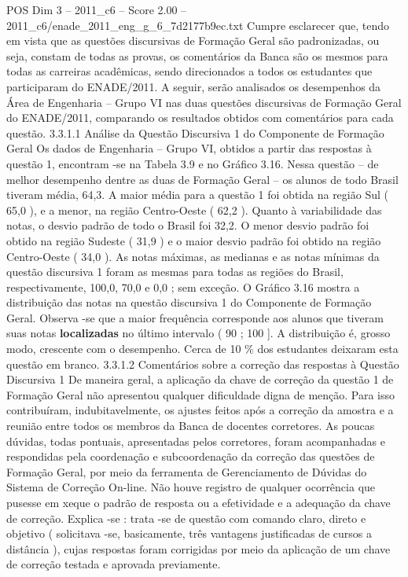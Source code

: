 \begin{textsample}{POS Dim 3 – 2011\_c6 – Score 2.00 – 2011\_c6/enade\_2011\_eng\_g\_6\_7d2177b9ec.txt}
Cumpre esclarecer que, tendo em vista que as questões discursivas de Formação Geral são padronizadas, ou seja, constam de todas as provas, os comentários da Banca são os mesmos para todas as carreiras acadêmicas, sendo direcionados a todos os estudantes que participaram do ENADE/2011.
A seguir, serão analisados os desempenhos da Área de Engenharia – Grupo VI nas duas questões discursivas de Formação Geral do ENADE/2011, comparando os resultados obtidos com comentários para cada questão. 3.3.1.1 Análise da Questão Discursiva 1 do Componente de Formação Geral Os dados de Engenharia – Grupo VI, obtidos a partir das respostas à questão 1, encontram -se na Tabela 3.9 e no Gráfico 3.16.
Nessa questão – de melhor desempenho dentre as duas de Formação Geral – os alunos de todo Brasil tiveram média, 64,3.
A maior média para a questão 1 foi obtida na região Sul ( 65,0 ), e a menor, na região Centro-Oeste ( 62,2 ).
Quanto à variabilidade das notas, o desvio padrão de todo o Brasil foi 32,2.
O menor desvio padrão foi obtido na região Sudeste ( 31,9 ) e o maior desvio padrão foi obtido na região Centro-Oeste ( 34,0 ).
As notas máximas, as medianas e as notas mínimas da questão discursiva 1 foram as mesmas para todas as regiões do Brasil, respectivamente, 100,0, 70,0 e 0,0 ; sem exceção.
O Gráfico 3.16 mostra a distribuição das notas na questão discursiva 1 do Componente de Formação Geral.
Observa -se que a maior frequência corresponde aos alunos que tiveram suas notas \textbf{localizadas} no último intervalo ( 90 ; 100 ].
A distribuição é, grosso modo, crescente com o desempenho.
Cerca de 10 \% dos estudantes deixaram esta questão em branco. 3.3.1.2 Comentários sobre a correção das respostas à Questão Discursiva 1 De maneira geral, a aplicação da chave de correção da questão 1 de Formação Geral não apresentou qualquer dificuldade digna de menção.
Para isso contribuíram, indubitavelmente, os ajustes feitos após a correção da amostra e a reunião entre todos os membros da Banca de docentes corretores.
As poucas dúvidas, todas pontuais, apresentadas pelos corretores, foram acompanhadas e respondidas pela coordenação e subcoordenação da correção das questões de Formação Geral, por meio da ferramenta de Gerenciamento de Dúvidas do Sistema de Correção On-line.
Não houve registro de qualquer ocorrência que pusesse em xeque o padrão de resposta ou a efetividade e a adequação da chave de correção.
Explica -se : trata -se de questão com comando claro, direto e objetivo ( solicitava -se, basicamente, três vantagens justificadas de cursos a distância ), cujas respostas foram corrigidas por meio da aplicação de um chave de correção testada e aprovada previamente.

\end{textsample}
